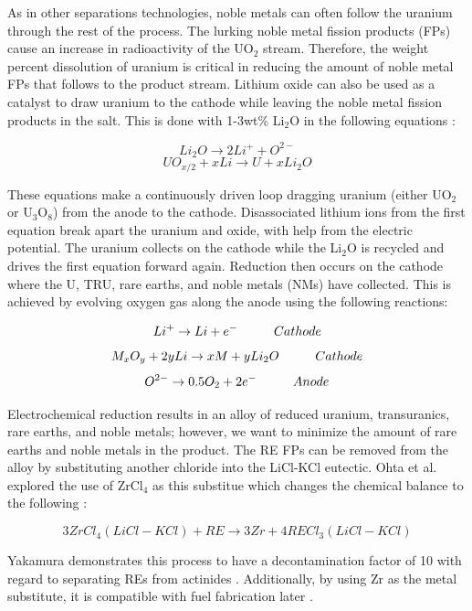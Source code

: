 As in other separations technologies, noble metals can often follow the uranium through the rest of the process.
The lurking noble metal fission products (FPs) cause an increase in radioactivity of the UO$_2$ stream. 
Therefore, the weight percent dissolution of uranium is critical in reducing the amount of noble metal FPs that follows to the product stream.
Lithium oxide can also be used as a catalyst to draw uranium to the cathode while leaving the noble metal fission products in the salt.
This is done with 1-3wt\% Li$_2$O in the following equations \cite{hur_electrochemical_nodate}:

\[ Li_2O \rightarrow 2Li^+ + O^{2-} \]
\[ UO_{x/2} + xLi \rightarrow U + xLi_2O \]

These equations make a continuously driven loop dragging uranium (either UO$_2$ or U$_3$O$_8$) from the anode to the cathode. 
Disassociated lithium ions from the first equation break apart the uranium and oxide, with help from the electric potential.
The uranium collects on the cathode while the Li$_2$O is recycled and drives the first equation forward again. 
Reduction then occurs on the cathode where the U, TRU, rare earths, and noble metals (NMs) have collected.
This is achieved by evolving oxygen gas along the anode using the following reactions\cite{hur_electrochemical_nodate,organisation}:

\[ Li^+ \rightarrow Li + e^- \hspace{10mm} Cathode \]
\[ M_xO_y + 2yLi \rightarrow xM + yLi_2O \hspace{10mm} Cathode \]
\[ O^{2-} \rightarrow 0.5O_2 + 2e^- \hspace{10mm} Anode \]

Electrochemical reduction results in an alloy of reduced uranium, transuranics, rare earths, and noble metals; however, we want to minimize the amount of rare earths and noble metals in the product.
The RE FPs can be removed from the alloy by substituting another chloride into the LiCl-KCl eutectic.
Ohta et al. explored the use of ZrCl$_4$ as this substitue which changes the chemical balance to the following \cite{ohta}:

\[ 3ZrCl_4(LiCl-KCl) + RE \rightarrow 3Zr + 4RECl_3(LiCl-KCl) \]

Yakamura demonstrates this process to have a decontamination factor of 10 with regard to separating REs from actinides \cite{sakamura}. Additionally, by using Zr as the metal substitute, it is compatible with fuel fabrication later \cite{ohta}.
